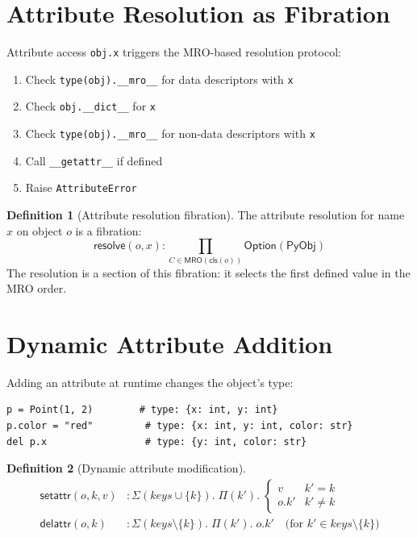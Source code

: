 \documentclass[11pt,a4paper]{report}
\theoremstyle{definition}
\newtheorem{definition}{Definition}[chapter]
\theoremstyle{plain}
\newcommand{\PyObj}{\mathsf{PyObj}}
\newcommand{\MRO}{\mathsf{MRO}}
\begin{document}
\section{Attribute Resolution as Fibration}

Attribute access \lstinline[style=python]{obj.x} triggers the MRO-based
resolution protocol:

\begin{enumerate}
  \item Check \lstinline[style=python]{type(obj).__mro__} for data descriptors with \texttt{x}
  \item Check \lstinline[style=python]{obj.__dict__} for \texttt{x}
  \item Check \lstinline[style=python]{type(obj).__mro__} for non-data descriptors with \texttt{x}
  \item Call \lstinline[style=python]{__getattr__} if defined
  \item Raise \lstinline[style=python]{AttributeError}
\end{enumerate}

\begin{definition}[Attribute resolution fibration]
The attribute resolution for name $x$ on object $o$ is a fibration:
\[
  \mathsf{resolve}(o, x) : \prod_{C \in \MRO(\mathsf{cls}(o))} \mathsf{Option}(\PyObj)
\]
The resolution is a section of this fibration: it selects the first defined
value in the MRO order.
\end{definition}

\section{Dynamic Attribute Addition}

Adding an attribute at runtime changes the object's type:
\begin{lstlisting}[style=python]
p = Point(1, 2)        # type: {x: int, y: int}
p.color = "red"         # type: {x: int, y: int, color: str}
del p.x                 # type: {y: int, color: str}
\end{lstlisting}

\begin{definition}[Dynamic attribute modification]
\begin{align}
  \mathsf{setattr}(o, k, v) &: \Sigma(\mathit{keys} \cup \{k\}).\;
    \Pi(k').\; \begin{cases} v & k' = k \\ o.k' & k' \neq k \end{cases} \\
  \mathsf{delattr}(o, k) &: \Sigma(\mathit{keys} \setminus \{k\}).\;
    \Pi(k').\; o.k' \quad\text{(for $k' \in \mathit{keys} \setminus \{k\}$)}
\end{align}
\end{definition}
\end{document}
